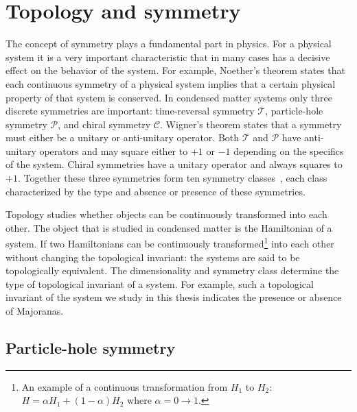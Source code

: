 \section{\label{sec:topology}Topology and symmetry}

The concept of symmetry plays a fundamental part in physics.
For a physical system it is a very important characteristic that in many cases has a decisive effect on the behavior of the system.
For example, Noether's theorem states that each continuous symmetry of a physical system implies that a certain physical property of that system is conserved.
In condensed matter systems only three discrete symmetries are important: time-reversal symmetry $\mathcal{T}$, particle-hole symmetry $\mathcal{P}$, and chiral symmetry $\mathcal{C}$.
Wigner's theorem states that a symmetry must either be a unitary or anti-unitary operator.
Both $\mathcal{T}$ and $\mathcal{P}$ have anti-unitary operators and may square either to $+1$ or $-1$ depending on the specifics of the system.
Chiral symmetries have a unitary operator and always squares to $+1$.
Together these three symmetries form ten symmetry classes~\cite{Altland1997}, each class characterized by the type and absence or presence of these symmetries.

Topology studies whether objects can be continuously transformed into each other.
The object that is studied in condensed matter is the Hamiltonian of a system.
If two Hamiltonians can be continuously transformed\footnote{An example of a continuous transformation from $H_{1}$ to $H_{2}$: $H=\alpha H_{1}+(1-\alpha)H_{2}$ where $\alpha=0\rightarrow1$.} into each other without changing the topological invariant: the systems are said to be topologically equivalent.
The dimensionality and symmetry class determine the type of topological invariant of a system.
For example, such a topological invariant of the system we study in this thesis indicates the presence or absence of Majoranas.

\subsection{Particle-hole symmetry\label{sec:phs}}

